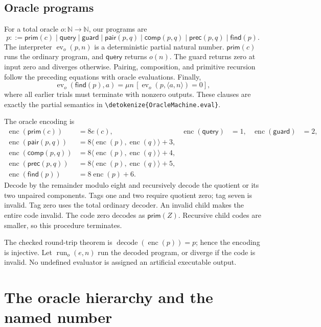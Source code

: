 \documentclass[11pt]{article}
\newcommand{\N}{\mathbb N}
\newcommand{\ev}{\operatorname{ev}}
\newcommand{\run}{\operatorname{run}}
\newcommand{\enc}{\operatorname{enc}}
\newcommand{\pair}[2]{\langle #1,#2\rangle}
\newcommand{\code}[1]{{\small\expandafter\nolinkurl\expandafter{\detokenize{#1}}}}
\begin{document}
\subsection{Oracle programs}

For a total oracle $o:\N\to\N$, our programs are
\[
 p::=\mathsf{prim}(c)\mid\mathsf{query}\mid\mathsf{guard}\mid
 \mathsf{pair}(p,q)\mid\mathsf{comp}(p,q)\mid\mathsf{prec}(p,q)\mid
 \mathsf{find}(p).
\]
The interpreter $\ev_o(p,n)$ is a deterministic partial natural number.
$\mathsf{prim}(c)$ runs the ordinary program, and $\mathsf{query}$ returns
$o(n)$. The guard returns zero at input zero and diverges otherwise.
Pairing, composition, and primitive recursion follow the preceding equations
with oracle evaluations. Finally,
\[
 \ev_o(\mathsf{find}(p),a)=
       \mu n\,[\ev_o(p,\pair an)=0],
\]
where all earlier trials must terminate with nonzero outputs. These clauses
are exactly the partial semantics in \code{OracleMachine.eval}.

The oracle encoding is
\begin{align*}
 \enc(\mathsf{prim}(c))&=8e(c),&
 \enc(\mathsf{query})&=1,&\enc(\mathsf{guard})&=2,\\
 \enc(\mathsf{pair}(p,q))&=8\pair{\enc(p)}{\enc(q)}+3,\\
 \enc(\mathsf{comp}(p,q))&=8\pair{\enc(p)}{\enc(q)}+4,\\
 \enc(\mathsf{prec}(p,q))&=8\pair{\enc(p)}{\enc(q)}+5,\\
 \enc(\mathsf{find}(p))&=8\enc(p)+6.
\end{align*}
Decode by the remainder modulo eight and recursively decode the quotient or
its two unpaired components. Tags one and two require quotient zero; tag
seven is invalid. Tag zero uses the total ordinary decoder. An invalid child
makes the entire code invalid. The code zero decodes as $\mathsf{prim}(Z)$.
Recursive child codes are smaller, so this procedure terminates.

The checked round-trip theorem is
$\operatorname{decode}(\enc(p))=p$; hence the encoding is injective.
Let $\run_o(e,n)$ run the decoded program, or diverge if the code is invalid.
No undefined evaluator is assigned an artificial executable output.

\section{The oracle hierarchy and the named number}\label{sec:hierarchy}
\end{document}
